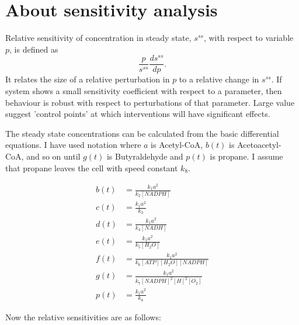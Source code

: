 \documentclass[12pt]{article}
\begin{document}
\section*{About sensitivity analysis }

\bigskip
\bigskip

Relative sensitivity of concentration in steady state, $s^{ss}$, with respect to variable $p$, is defined as \[\frac{p}{s^{ss}}\frac{ds^{ss}}{dp}.\] It relates the size of a relative perturbation in $p$ to a relative change in $s^{ss}$. If system shows a small sensitivity coefficient with respect to a parameter, then behaviour is robust with respect to perturbations of that parameter. Large value suggest 'control points' at which interventions will have significant effects. 

The steady state concentrations can be calculated from the basic differential equations. I have used notation where $a$ is Acetyl-CoA, $b(t)$ is Acetoacetyl-CoA, and so on until $g(t)$ is Butyraldehyde and $p(t)$ is propane. I assume that propane leaves the cell with speed constant $k_8$.

\begin{align*}
b(t) &= \frac{k_1a^2}{k_2[NADPH]} \\
c(t) &= \frac{k_1a^2}{k_3} \\
d(t) &= \frac{k_1a^2}{k_4[NADH]} \\
e(t) &= \frac{k_1a^2}{k_5[H_2O]} \\
f(t) &= \frac{k_1a^2}{k_6[ATP][H_2O][NADPH]}\\
g(t) &= \frac{k_1a^2}{k_7[NADPH]^2[H]^2[O_2]}\\
p(t) &= \frac{k_1a^2}{k_8}
\end{align*}

Now the relative sensitivities are as follows: 
\end{document}
